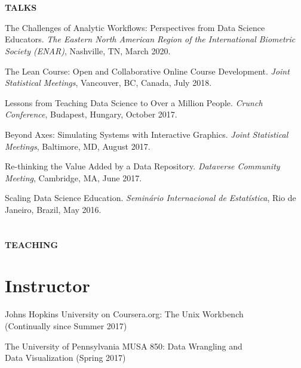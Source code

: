 \vspace{0.1in}

\section{} \textbf{TALKS} \vspace{0.05in}

\begin{innerlist}
\item The Challenges of Analytic Workflows: Perspectives from Data Science Educators. \textit{The Eastern North American Region of the International Biometric Society (ENAR)}, Nashville, TN, March 2020.
\item The Lean Course: Open and Collaborative Online Course Development. \textit{Joint Statistical Meetings}, Vancouver, BC, Canada, July 2018.
\item Lessons from Teaching Data Science to Over a Million People. \textit{Crunch Conference}, Budapest, Hungary, October 2017.
\item Beyond Axes: Simulating Systems with Interactive Graphics. \textit{Joint Statistical Meetings}, Baltimore, MD, August 2017.
\item Re-thinking the Value Added by a Data Repository. \textit{Dataverse Community Meeting}, Cambridge, MA, June 2017.
\item Scaling Data Science Education. \textit{Seminário Internacional de Estatística}, Rio de Janeiro, Brazil, May 2016.
\end{innerlist}


\section{} \textbf{TEACHING} \vspace{-0.05in}

\section{Instructor}

\begin{innerlist}
\item Johns Hopkins University on Coursera.org: The Unix Workbench \\ (Continually since Summer 2017)
\item The University of Pennsylvania MUSA 850: Data Wrangling and \\ Data Visualization (Spring 2017)
\end{innerlist}

